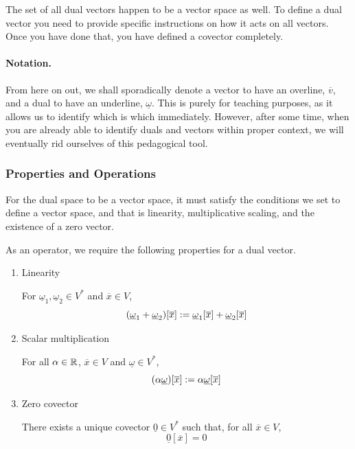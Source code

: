 		The set of all dual vectors happen to be a vector space as well. To define 
		a dual vector you need to provide specific instructions on how it acts
		on all vectors. Once you have done that, you have defined a covector completely.

		\paragraph{Notation.} From here on out, we shall sporadically denote a vector to have an overline, $\overline{v}$, and 
		a dual to have an underline, $\underline{\omega}$. This is purely for teaching purposes, as it allows us to 
		identify which is which immediately. However, after some time, when you are already 
		able to identify duals and vectors within proper context, we will eventually rid ourselves of this pedagogical tool.

	\subsubsection{Properties and Operations}

		For the dual space to be a vector space, it must satisfy the 
		conditions we set to define a vector space, and that is linearity,
		multiplicative scaling, and the existence of a zero vector.

		As an operator, we require the following properties for a dual vector.
		\begin{enumerate}
			\item Linearity

				For $\underline{\omega}_1,\underline{\omega}_2\in V^*$ and $\overline{x}\in V$,
				\[
					\pqty{
						\underline{\omega}_1
						+
						\underline{\omega}_2
					}
					[\overline{x}]
					:=
					\underline{\omega}_1[\overline{x}]
					+
					\underline{\omega}_2[\overline{x}]
				\]
				
			\item Scalar multiplication

				For all $\alpha\in\mathbb{R}$, $\overline x \in V$ and $\underline{\omega}\in V^*$,
				\[
					\pqty{
						\alpha
						\underline{\omega}
					}
					[\overline{x}]
					:=
					\alpha\underline{\omega}[\overline{x}]
				\]

			\item Zero covector

				There exists a unique covector $\underline{0}\in V^*$ such that, for all $\overline{x}\in V$,
				\[
					\underline{0}[\overline{x}] = 0
				\]
		\end{enumerate}

